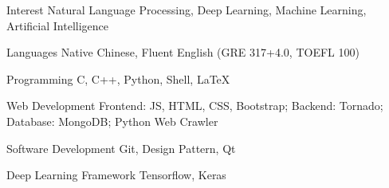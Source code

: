 

\begin{cvskills}


  \cvskill
    {Interest} %
    {Natural Language Processing, Deep Learning, Machine Learning, Artificial Intelligence} %

    

  \cvskill
    {Languages} %
    {Native Chinese, Fluent English (GRE 317+4.0, TOEFL 100)} %


  \cvskill
    {Programming} %
    {C, C++, Python, Shell, LaTeX} %

  \cvskill
    {Web Development} %
    {Frontend: JS, HTML, CSS, Bootstrap; Backend: Tornado; Database: MongoDB; Python Web Crawler} %

  \cvskill
    {Software Development} %
    {Git, Design Pattern, Qt} %

  \cvskill
    {Deep Learning Framework} %
    {Tensorflow, Keras} %

\end{cvskills}
